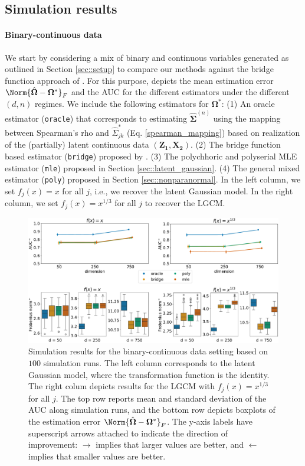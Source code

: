 \subsection{Simulation results}

\paragraph{Binary-continuous data}

We start by considering a mix of binary and continuous variables generated as outlined in Section \ref{sec::setup} to compare our methods against the bridge function approach of \citet{Fan17}. For this purpose,  depicts the mean estimation error $\Norm{\hat{\mathbf\Omega} - \mathbf\Omega^*}_F$ and the AUC for the different estimators under the different $(d,n)$ regimes. We include the following estimators for \(\mathbf\Omega^*\): (1) An oracle estimator (\texttt{oracle}) that corresponds to estimating $\hat{\mathbf\Sigma}^{(n)}$ using the mapping between Spearman's rho and \(\hat\Sigma_{jk}^*\) (Eq. \eqref{spearman_mapping}) based on realization of the (partially) latent continuous data $(\mathbf{Z_1},\mathbf{X_2})$. (2) The bridge function based estimator (\texttt{bridge}) proposed by \citet{Fan17}. (3) The polychhoric and polyserial MLE estimator (\texttt{mle}) proposed in Section \ref{sec::latent_gaussian}. (4) The general mixed estimator (\texttt{poly}) proposed in Section \ref{sec::nonparanormal}. In the left column, we set $f_j(x) = x$ for all $j$, i.e., we recover the latent Gaussian model. In the right column, we set $f_j(x) = x^{1/3}$ for all $j$ to recover the LGCM.


\begin{figure}
    \centering
    \includegraphics[width=\textwidth]{Figures/simulation_results_binary.pdf}
    \caption{Simulation results for the binary-continuous data setting based on \(100\) simulation runs. The left column corresponds to the latent Gaussian model, where the transformation function is the identity. The right colum depicts results for the LGCM with \(f_j(x) = x^{1/3}\) for all \(j\). The top row reports mean and standard deviation of the AUC along simulation runs, and the bottom row depicts boxplots of the estimation error $\Norm{\hat{\mathbf\Omega} - \mathbf\Omega^*}_F$. The y-axis labels have superscript arrows attached to indicate the direction of improvement: \(\rightarrow\) implies that larger values are better, and \(\leftarrow\) implies that smaller values are better.}
    \label{fig:bench_binary}
\end{figure}

